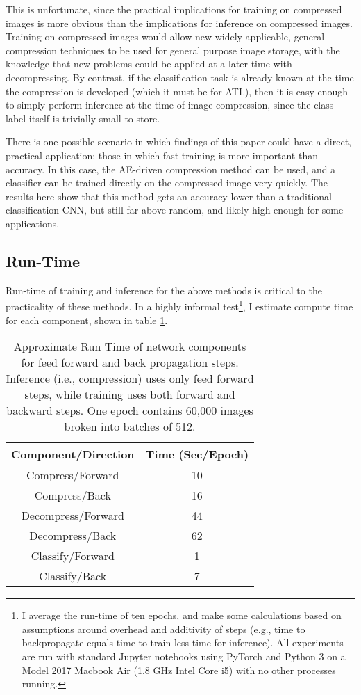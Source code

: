 \documentclass[twoside,11pt]{article}
\begin{document}
This is unfortunate, since the practical implications for training on compressed images 
is more obvious than the implications for inference on compressed images. Training on 
compressed images would allow new widely applicable, general compression techniques to 
be used for general purpose image storage, with the knowledge that new problems could be
applied at a later time with decompressing. By contrast, if the classification task is
already known at the time the compression is developed (which it must be for ATL), 
then it is easy enough to simply perform inference at the time of
image compression, since the class label itself is trivially small to store. 

There is one possible scenario in which findings of this paper could have a direct, practical
application: those in which
fast training is more important than accuracy. In this case, the AE-driven compression
method can be used, and a classifier can be trained directly on the compressed image very quickly.
The results here show that this method gets an accuracy lower than a traditional 
classification CNN, but still far above random, and likely high enough for some applications.

\subsection{Run-Time}

Run-time of training and inference for the above methods is critical to the practicality
of these methods. In a highly informal test\footnote{I average the run-time of ten epochs,
and make some calculations based on assumptions around overhead and additivity of steps
(e.g., time to backpropagate equals time to train less time for inference).
All experiments are run with standard Jupyter notebooks using PyTorch and Python 3
on a Model 2017 Macbook Air (1.8 GHz Intel Core i5) with no other processes running.},
I estimate compute time for each component, shown in table \ref{table:runtime}.


\begin{table}[h]
  \centering
  \begin{tabular}{|c|c|}
    \hline
    Component/Direction & Time (Sec/Epoch) \\   \hline \hline
    Compress/Forward & 10 \\ \hline  
    Compress/Back & 16 \\ \hline
    Decompress/Forward & 44 \\ \hline
    Decompress/Back & 62 \\ \hline
    Classify/Forward & 1 \\ \hline
    Classify/Back & 7 \\ \hline 
  \end{tabular}
  \caption{Approximate Run Time of network components for feed forward and back propagation
    steps. Inference (i.e., compression) uses only feed forward steps, while training
    uses both forward and backward steps. One epoch contains 60,000 images broken into 
    batches of 512.}
  \label{table:runtime}
\end{table}
\end{document}
